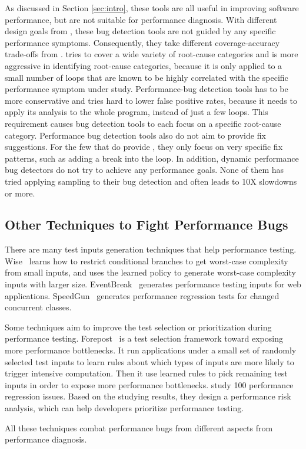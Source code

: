 As discussed in 
Section \ref{sec:intro}, these tools are all useful in improving software
performance, but are not suitable for performance diagnosis.
With different design goals from \Tool, these bug detection tools are not 
guided by any specific
performance symptoms. Consequently, they take different coverage-accuracy
trade-offs from \Tool. \Tool tries to cover a wide variety of root-cause 
categories and is more aggressive in identifying root-cause categories, because
it is only applied to a small number of loops that are known to be highly
correlated with the specific performance symptom under study.
Performance-bug detection tools has to be more conservative and tries hard
to lower false positive rates, because it needs to apply its analysis to the
whole program, instead of just a few loops. This requirement causes bug
detection tools to each focus on a specific root-cause category.
Performance bug detection tools also do not aim to provide fix suggestions.
For the few that do provide \cite{CARAMEL}, they only focus on very specific
fix patterns, such as adding a break into the loop. 
In addition, dynamic performance bug detectors do not try to achieve any
performance goals. None of them has tried applying sampling to their
bug detection and often leads to 10X slowdowns or more.

\subsection{Other Techniques to Fight Performance Bugs}

There are many test inputs generation techniques that help
performance testing. 
Wise~\cite{WISE} learns how to restrict conditional branches to get worst-case complexity from small inputs, 
and uses the learned policy to generate worst-case complexity inputs with 
larger size. 
EventBreak~\cite{EventBreak} generates performance testing inputs 
for web applications. 
SpeedGun~\cite{SpeedGun} generates performance regression tests for 
changed concurrent classes.

Some techniques aim to improve the test selection or prioritization during 
performance testing. 
Forepost~\cite{Forepost} is a test selection framework toward exposing more performance bottlenecks. 
It run applications under a small set of randomly selected test inputs to learn rules 
about which types of inputs are more likely to trigger intensive computation. 
Then it use learned rules to pick remaining test inputs in order to expose more performance bottlenecks. 
\citet{Huang:2014:PRT:2568225.2568232} study 100 performance regression issues. Based on the studying results, 
they design a performance risk analysis, which can help developers prioritize performance testing.  

All these techniques combat performance bugs from different aspects from performance diagnosis.
